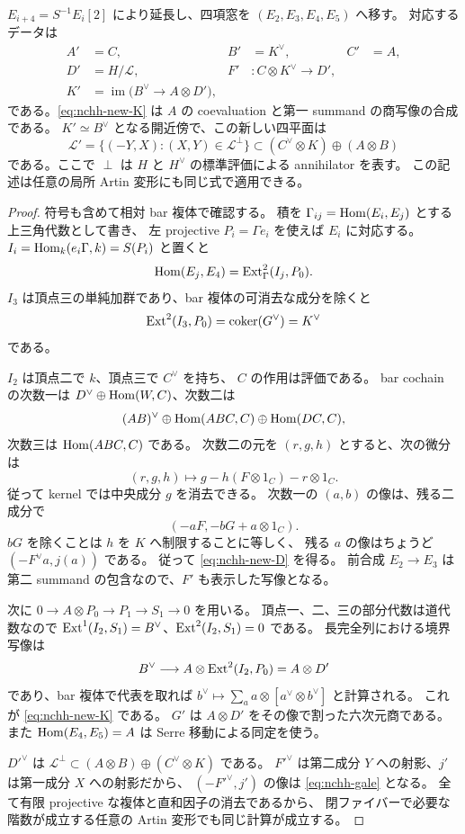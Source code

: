 \begin{lemma}[二項移動の有限線型代数]\label{lem:nchh-gale}
$E_{i+4}=S^{-1}E_i[2]$ により延長し、四項窓を
$(E_2,E_3,E_4,E_5)$ へ移す。
対応するデータは
\begin{align}
A'&=C,& B'&=K^{\vee},& C'&=A,\label{eq:nchh-new-small}\\
D'&=H/\mathscr L,&
F'&:C\otimes K^{\vee}\longrightarrow D',\label{eq:nchh-new-D}\\
K'&=\operatorname{im}\bigl(B^{\vee}\longrightarrow A\otimes D'\bigr),\label{eq:nchh-new-K}
\end{align}
である。\eqref{eq:nchh-new-K} は $A$ の coevaluation と第一 summand の商写像の合成である。
$K'\simeq B^{\vee}$ となる開近傍で、この新しい四平面は
\begin{equation}\label{eq:nchh-gale}
\mathscr L'=\{(-Y,X):(X,Y)\in\mathscr L^{\perp}\}
 \subset(C^{\vee}\otimes K)\oplus(A\otimes B)
\end{equation}
である。ここで $\perp$ は $H$ と $H^{\vee}$ の標準評価による annihilator を表す。
この記述は任意の局所 Artin 変形にも同じ式で適用できる。
\end{lemma}

\begin{proof}
符号も含めて相対 bar 複体で確認する。
積を $\Gamma_{ij}=\operatorname{Hom}(E_i,E_j)$ とする上三角代数として書き、
左 projective $P_i=\Gamma e_i$ を使えば $E_i$ に対応する。
$I_i=\operatorname{Hom}_k(e_i\Gamma,k)=S(P_i)$ と置くと
\[
\operatorname{Hom}(E_j,E_4)=\operatorname{Ext}^2_{\Gamma}(I_j,P_0).
\]
$I_3$ は頂点三の単純加群であり、bar 複体の可消去な成分を除くと
\[
\operatorname{Ext}^2(I_3,P_0)=\operatorname{coker}(G^{\vee})=K^{\vee}
\]
である。

$I_2$ は頂点二で $k$、頂点三で $C^{\vee}$ を持ち、
$C$ の作用は評価である。
bar cochain の次数一は
$D^{\vee}\oplus\operatorname{Hom}(W,C)$、次数二は
\[
(A B)^{\vee}\oplus\operatorname{Hom}(A B C,C)\oplus\operatorname{Hom}(D C,C),
\]
次数三は $\operatorname{Hom}(A B C,C)$ である。
次数二の元を $(r,g,h)$ とすると、次の微分は
\[
(r,g,h)\longmapsto g-h(F\otimes1_C)-r\otimes1_C.
\]
従って kernel では中央成分 $g$ を消去できる。
次数一の $(a,b)$ の像は、残る二成分で
\[
(-aF,-bG+a\otimes1_C).
\]
$bG$ を除くことは $h$ を $K$ へ制限することに等しく、
残る $a$ の像はちょうど $(-F^{\vee}a,j(a))$ である。
従って \eqref{eq:nchh-new-D} を得る。
前合成 $E_2\to E_3$ は第二 summand の包含なので、$F'$ も表示した写像となる。

次に $0\to A\otimes P_0\to P_1\to S_1\to0$ を用いる。
頂点一、二、三の部分代数は道代数なので
$\operatorname{Ext}^1(I_2,S_1)=B^{\vee}$、$\operatorname{Ext}^2(I_2,S_1)=0$ である。
長完全列における境界写像は
\[
B^{\vee}\longrightarrow A\otimes\operatorname{Ext}^2(I_2,P_0)=A\otimes D'
\]
であり、bar 複体で代表を取れば
$b^{\vee}\mapsto\sum_a a\otimes[a^{\vee}\otimes b^{\vee}]$ と計算される。
これが \eqref{eq:nchh-new-K} である。
$G'$ は $A\otimes D'$ をその像で割った六次元商である。
また $\operatorname{Hom}(E_4,E_5)=A$ は Serre 移動による同定を使う。

$D'^{\vee}$ は $\mathscr L^{\perp}\subset
(A\otimes B)\oplus(C^{\vee}\otimes K)$ である。
$F'^{\vee}$ は第二成分 $Y$ への射影、$j'$ は第一成分 $X$ への射影だから、
$(-F'^{\vee},j')$ の像は \eqref{eq:nchh-gale} となる。
全て有限 projective な複体と直和因子の消去であるから、
閉ファイバーで必要な階数が成立する任意の Artin 変形でも同じ計算が成立する。
\end{proof}


